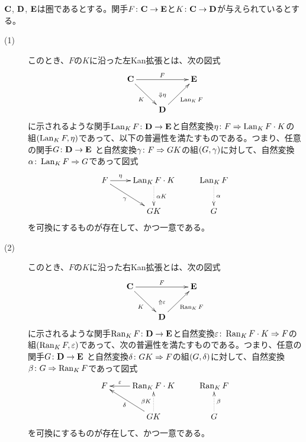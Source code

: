   \begin{definition}
    $\textbf{C}$, $\textbf{D}$, $\textbf{E}$は圏であるとする。関手$F \colon \textbf{C} \to \textbf{E}$と$K \colon \textbf{C} \to \textbf{D}$が与えられているとする。
  \begin{description}
    \item[(1)] このとき、$F$の$K$に沿った左Kan拡張とは、次の図式
    \[
    \xymatrix{
    \bfc \ar[rd]_K \ar[rr]^F & {} \ar@{}[d]|{\Downarrow \eta} & \bfe \\
    {} &  \bfd \ar[ru]_{\Lan_K F} &{}
    }
    \]
    に示されるような関手$\operatorname{Lan}_K F \colon \textbf{D} \to \textbf{E}$と自然変換$\eta \colon F \Rightarrow \operatorname{Lan}_K F \cdot K$の組$(\operatorname{Lan}_K F, \eta)$であって、以下の普遍性を満たすものである。つまり、任意の関手$G \colon \textbf{D} \to \textbf{E}$
    と自然変換${\gamma} \colon F \Rightarrow G K$の組$(G,{\gamma})$に対して、自然変換${\alpha} \colon \operatorname{Lan}_K F \Rightarrow G$であって図式
    \[
  \xymatrix{
  F \ar[r]^-{\eta} \ar[rd]_-{\grg} & \Lan_K F \cdot K \ar@{.>}[d]^{\gra K} & \Lan_K F \ar@{.>}[d]^{\gra} \\
  {} & GK & G
  }
    \]
    を可換にするものが存在して、かつ一意である。
    \item[(2)] このとき、$F$の$K$に沿った右Kan拡張とは、次の図式
    \[
    \xymatrix{
    \bfc \ar[rd]_K \ar[rr]^F & {} \ar@{}[d]|{\Uparrow \ve} & \bfe \\
    {} &  \bfd \ar[ru]_{\Ran_K F} &{}
    }
    \]
    に示されるような関手$\operatorname{Ran}_K F \colon \textbf{D} \to \textbf{E}$と自然変換${\varepsilon} \colon \operatorname{Ran}_K F \cdot K \Rightarrow F$の組$(\operatorname{Ran}_K F, {\varepsilon})$であって、次の普遍性を満たすものである。つまり、任意の関手$G \colon \textbf{D} \to \textbf{E}$
    と自然変換${\delta} \colon G K \Rightarrow F $の組$(G,{\delta})$に対して、自然変換$\beta \colon G \Rightarrow \operatorname{Ran}_K F $であって図式
    \[
    \xymatrix{
    F   & \Ran_K F \cdot K \ar[l]_-{\ve}  & \Ran_K F  \\
    {} & GK \ar@{.>}[u]^{\beta K} \ar[lu]^-{\grd} & G \ar@{.>}[u]_{\beta}
    }
    \]
    を可換にするものが存在して、かつ一意である。
  \end{description}

  \end{definition}



